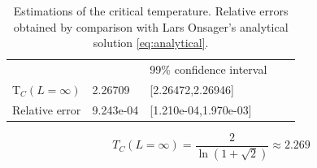 
 \begin{table}[htp]
 \centering
 \begin{tabular}{|l|l|l|ll}
 \cline{1-3}
                &        & 99\% confidence interval  &  &  \\ \cline{1-3}
 T$_C(L=\infty)$          & 2.26709   & {[}2.26472,2.26946{]}     &  &  \\ \cline{1-3}
 Relative error & 9.243e-04 & {[}1.210e-04,1.970e-03{]} &  &  \\ \cline{1-3}
 \end{tabular}
 \caption{Estimations of the critical temperature. Relative errors obtained by
 comparison with Lars Onsager's analytical solution \cref{eq:analytical}.}
 \label{tab:results}
 \end{table}


\begin{equation}
  \label{eq:analytical}
  T_C(L=\infty) = \frac{2}{\ln(1 + \sqrt2)} \approx 2.269
\end{equation}
